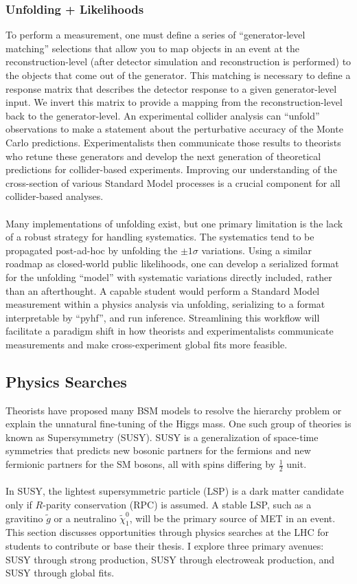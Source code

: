 \subsubsection{Unfolding + Likelihoods} \label{sssec:unfolding-likelihoods}
To perform a measurement, one must define a series of \enquote{generator-level matching} selections that allow you to map objects in an event at the reconstruction-level (after detector simulation and reconstruction is performed) to the objects that come out of the generator. This matching is necessary to define a response matrix that describes the detector response to a given generator-level input. We invert this matrix to provide a mapping from the reconstruction-level back to the generator-level. An experimental collider analysis can \enquote{unfold} observations to make a statement about the perturbative accuracy of the Monte Carlo predictions. Experimentalists then communicate those results to theorists who retune these generators and develop the next generation of theoretical predictions for collider-based experiments. Improving our understanding of the cross-section of various Standard Model processes is a crucial component for all collider-based analyses.
\\
\\
Many implementations of unfolding exist, but one primary limitation is the lack of a robust strategy for handling systematics. The systematics tend to be propagated post-ad-hoc by unfolding the $\pm 1 \sigma$ variations. Using a similar roadmap as closed-world public likelihoods, one can develop a serialized format for the unfolding \enquote{model}  with systematic variations directly included, rather than an afterthought. A capable student would perform a Standard Model measurement within a physics analysis via unfolding, serializing to a format interpretable by \enquote{pyhf}, and run inference. Streamlining this workflow will facilitate a paradigm shift in how theorists and experimentalists communicate measurements and make cross-experiment global fits more feasible.

\subsection{Physics Searches} \label{ssec:physics-searches}
Theorists have proposed many BSM models to resolve the hierarchy problem or explain the unnatural fine-tuning of the Higgs mass. One such group of theories is known as Supersymmetry (SUSY). SUSY is a generalization of space-time symmetries that predicts new bosonic partners for the fermions and new fermionic partners for the SM bosons, all with spins differing by $\frac{1}{2}$ unit.
\\
\\
In SUSY, the lightest supersymmetric particle (LSP) is a dark matter candidate only if $R$-parity conservation (RPC) is assumed. A stable LSP, such as a gravitino $\tilde{g}$ or a neutralino $\tilde{\chi}_1^0$, will be the primary source of MET in an event. This section discusses opportunities through physics searches at the LHC for students to contribute or base their thesis. I explore three primary avenues: SUSY through strong production, SUSY through electroweak production, and SUSY through global fits.

